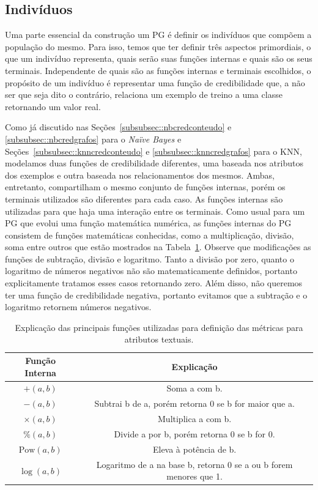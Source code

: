 \subsection{Indivíduos}
\label{subsec::individuos}

Uma parte essencial da construção um \textsc{PG} é definir os indivíduos que compõem a população do mesmo.
Para isso, temos que ter definir três aspectos primordiais, o que um indivíduo representa, quais serão suas funções internas e quais são os seus terminais. Independente de quais são as funções internas e terminais escolhidos, o propósito de um indivíduo é representar uma função de credibilidade que, a não ser que seja dito o contrário, relaciona um exemplo de treino a uma classe retornando um valor real. 

Como já discutido nas Seções~\ref{subsubsec::nbcredconteudo} e \ref{subsubsec::nbcredgrafos} para o \textit{Naïve Bayes} e Seções~\ref{subsubsec::knncredconteudo} e \ref{subsubsec::knncredgrafos} para o \textsc{KNN}, modelamos duas funções de credibilidade diferentes, uma baseada nos atributos dos exemplos e outra baseada nos relacionamentos dos mesmos.
Ambas, entretanto, compartilham o mesmo conjunto de funções internas, porém os terminais utilizados são diferentes para cada caso. As funções internas são utilizadas para que haja uma interação entre os terminais.
Como usual para um \textsc{PG} que evolui uma função matemática numérica, as funções internas do \textsc{PG} consistem de funções matemáticas conhecidas, como a multiplicação, divisão, soma entre outros que estão mostrados na Tabela~\ref{table::funcoespg}. 
Observe que modificações as funções de subtração, divisão e logaritmo.
Tanto a divisão por zero, quanto o logaritmo de números negativos não são matematicamente definidos, portanto explicitamente tratamos esses casos retornando zero. Além disso, não queremos ter uma função de credibilidade negativa, portanto evitamos que a subtração e o logaritmo retornem números negativos.

\begin{table}[ht*]
\centering
\begin{tabular}{|c|c|}
\toprule
    \textbf{Função Interna} & \textbf{Explicação} \\
\midrule
    $+(a,b)$           & Soma a com b. \tabularnewline \hline
    $-(a,b)$           & Subtrai b de a, porém retorna 0 se b for maior que a.\tabularnewline \hline
    $\times(a,b) $     & Multiplica a com b. \tabularnewline \hline
    $\%(a,b)$          & Divide a por b, porém retorna 0 se b for 0. \tabularnewline \hline
    $\text{Pow}(a,b)$  & Eleva à potência de b. \tabularnewline \hline 
    $\log(a,b) $       & Logaritmo de a na base b, retorna 0 se a ou b forem menores que 1. \tabularnewline
\bottomrule
\end{tabular}
\caption{Explicação das principais funções utilizadas para definição das métricas para atributos textuais.}
\label{table::funcoespg}
\end{table}

